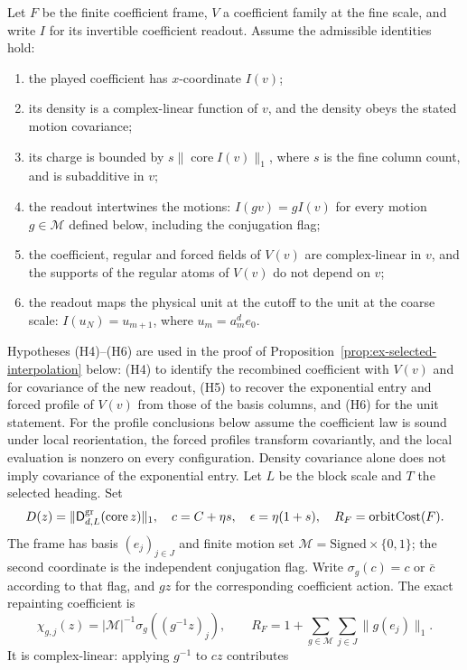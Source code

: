 Let $F$ be the finite coefficient frame, $V$ a coefficient family at the fine scale, and
write $I$ for its invertible coefficient readout. Assume the admissible identities
hold:
\begin{enumerate}
\item[(H1)] the played coefficient has $x$-coordinate $I(v)$;
\item[(H2)] its density is a complex-linear function of $v$, and the density
      obeys the stated motion covariance;
\item[(H3)] its charge is bounded by $s\|\operatorname{core}I(v)\|_1$,
      where $s$ is the fine column count, and is subadditive in $v$;
\item[(H4)] the readout intertwines the motions: $I(gv)=gI(v)$ for every
      motion $g\in\mathcal M$ defined below, including the conjugation flag;
\item[(H5)] the coefficient, regular and forced fields of $V(v)$ are
      complex-linear in $v$, and the supports of the regular atoms of $V(v)$
      do not depend on $v$;
\item[(H6)] the readout maps the physical unit at the cutoff to the unit at
      the coarse scale: $I(u_N)=u_{m+1}$, where $u_m=a_m^de_0$.
\end{enumerate}
Hypotheses (H4)--(H6) are used in the proof of
Proposition~\ref{prop:ex-selected-interpolation} below: (H4) to identify the
recombined coefficient with $V(v)$ and for covariance of the new readout,
(H5) to recover the exponential entry and forced profile of $V(v)$ from
those of the basis columns, and (H6) for the unit statement. For the profile conclusions below assume
the coefficient law is sound under local reorientation, the forced profiles
transform covariantly, and the local evaluation is nonzero on every
configuration. Density covariance alone does not imply covariance of the
exponential entry. Let
$L$ be the block scale and $T$ the selected heading. Set
\[
 D(z)=\|\mathsf D^{\rm gr}_{d,L}(\operatorname{core}z)\|_1,
 \quad c=C+\eta s,\quad \epsilon=\eta(1+s),
 \quad R_F=\operatorname{orbitCost}(F).
\]
The frame has basis $(e_j)_{j\in J}$ and finite motion set
$\mathcal M=\mathrm{Signed}\times\{0,1\}$; the second coordinate is the
independent conjugation flag. Write $\sigma_g(c)=c$ or $\bar c$ according to
that flag, and $g z$ for the corresponding coefficient action. The exact
repainting coefficient is
\[
 \chi_{g,j}(z)=|\mathcal M|^{-1}\sigma_g((g^{-1}z)_j),
 \qquad R_F=1+\sum_{g\in\mathcal M}\sum_{j\in J}\|g(e_j)\|_1.
\]
It is complex-linear: applying $g^{-1}$ to $cz$ contributes
